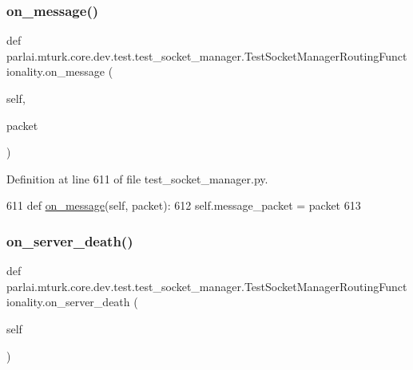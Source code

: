 \subsubsection{\texorpdfstring{on\+\_\+message()}{on\_message()}}
{\footnotesize\ttfamily def parlai.\+mturk.\+core.\+dev.\+test.\+test\+\_\+socket\+\_\+manager.\+Test\+Socket\+Manager\+Routing\+Functionality.\+on\+\_\+message (\begin{DoxyParamCaption}\item[{}]{self,  }\item[{}]{packet }\end{DoxyParamCaption})}



Definition at line 611 of file test\+\_\+socket\+\_\+manager.\+py.


\begin{DoxyCode}
611     \textcolor{keyword}{def }\hyperlink{namespaceparlai_1_1chat__service_1_1services_1_1terminal__chat_1_1client_a0ef2bb2bd3b966dcdd8402a92b999708}{on\_message}(self, packet):
612         self.message\_packet = packet
613 
\end{DoxyCode}
\mbox{\label{classparlai_1_1mturk_1_1core_1_1dev_1_1test_1_1test__socket__manager_1_1TestSocketManagerRoutingFunctionality_aa0be4af1e2826092404690672b60dd5a}} 
\subsubsection{\texorpdfstring{on\+\_\+server\+\_\+death()}{on\_server\_death()}}
{\footnotesize\ttfamily def parlai.\+mturk.\+core.\+dev.\+test.\+test\+\_\+socket\+\_\+manager.\+Test\+Socket\+Manager\+Routing\+Functionality.\+on\+\_\+server\+\_\+death (\begin{DoxyParamCaption}\item[{}]{self }\end{DoxyParamCaption})}



